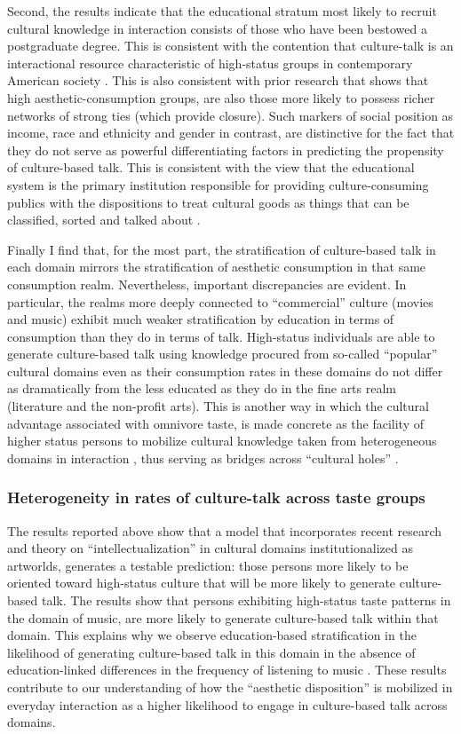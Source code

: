 \documentclass[11pt]{article}
\begin{document}
Second, the results indicate that the educational stratum most likely to recruit cultural knowledge in interaction consists of those who have been bestowed a postgraduate degree. This is consistent with the contention that culture-talk is an interactional resource characteristic of high-status groups in contemporary American society \citep{collins04}. This is also consistent with prior research that shows that high aesthetic-consumption groups, are also those more likely to possess richer networks of strong ties (which provide closure).  Such markers of social position as income, race and ethnicity and gender in contrast, are distinctive for the fact that they do not serve as powerful differentiating factors in predicting the propensity of culture-based talk. This is consistent with the view that the educational system is the primary institution responsible for providing culture-consuming publics with the dispositions to treat cultural goods as things that can be classified, sorted and talked about \citep{bourdieu93b, dimaggio00, lizardo08}.  

Finally I find that, for the most part, the stratification of culture-based talk in each domain mirrors the stratification of aesthetic consumption in that same consumption realm. Nevertheless, important discrepancies are evident.   In particular, the realms more deeply connected to ``commercial'' culture (movies and music) exhibit much weaker stratification by education in terms of consumption than they do in terms of talk.  High-status individuals are able to generate culture-based talk using knowledge procured from so-called ``popular'' cultural domains even as their consumption rates in these domains do not differ as dramatically from the less educated as they do in the fine arts realm (literature and the non-profit arts). This is another way in which the cultural advantage associated with omnivore taste, is made concrete as the facility of higher status persons to mobilize cultural knowledge taken from heterogeneous domains in interaction \citep{ollivier08}, thus serving as bridges across ``cultural holes'' \citep{lizardo06a, pachuki_breiger10}.

\subsubsection{Heterogeneity in rates of culture-talk across taste groups}
The results reported above show that a model that incorporates recent research and theory on ``intellectualization'' in cultural domains institutionalized as artworlds, generates a testable prediction: those persons more likely to be oriented toward high-status culture that will be more likely to generate culture-based talk. The results show that persons exhibiting high-status taste patterns in the domain of music, are more likely to generate culture-based talk within that domain.  This explains why we observe education-based stratification in the likelihood of generating culture-based talk in this domain in the absence of education-linked differences in the frequency of listening to music \citep{denora00}. These results contribute to our understanding of how the ``aesthetic disposition'' is mobilized in everyday interaction as a higher likelihood to engage in culture-based talk across domains. 
\end{document}

